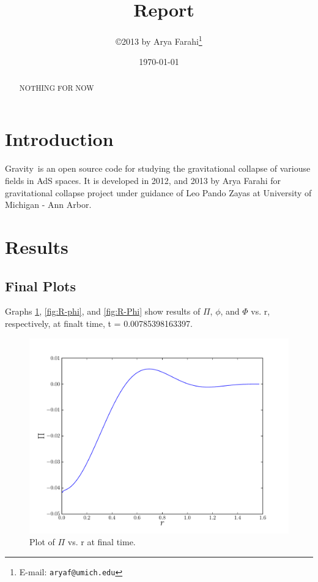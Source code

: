 \documentclass[12pt]{article}
\title{\grv\ Report}
\author{\copyright 2013 by Arya Farahi\thanks{E-mail: {\tt aryaf@umich.edu}}}
\date{\today}
\def\grv{{\sc Gravity}}
\begin{document}
\maketitle

\begin{abstract}
NOTHING FOR NOW
\end{abstract}


\section{Introduction}

\grv\ is an open source code for studying the gravitational collapse of variouse fields in AdS spaces. It is developed in 2012, and 2013 by Arya Farahi for gravitational collapse project under guidance of Leo Pando Zayas at University of Michigan - Ann Arbor. 
\section{Results}
\subsection{Final Plots}

Graphs \ref{fig:R-Pi}, \ref{fig:R-phi}, and \ref{fig:R-Phi} show results of $\Pi$, $\phi$, and $\Phi$ vs. r, respectively, at finalt time, t =  0.00785398163397.

\begin{figure}[hbt]
 \centering
 \includegraphics[width=12cm]{./Report/PivrR.pdf}
 \caption{Plot of $\Pi$ vs. r at final time.}
 \label{fig:R-Pi}
\end{figure}
\end{document}
